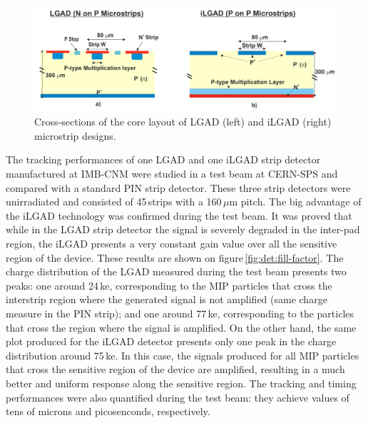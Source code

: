 \begin{figure}[t!]
\centering
\includegraphics[width=0.6\hsize]{Detector/fig/cross-section.png}
\caption{Cross-sections of the core layout of LGAD (left) and iLGAD (right) microstrip designs.}
\label{fig:det:cross-section}
\end{figure}

The tracking performances of one LGAD and one iLGAD strip detector manufactured at IMB-CNM were studied in a test beam at CERN-SPS and compared with a standard PIN strip detector. These three strip detectors were unirradiated and consisted of 45\,strips with a 160\,$\mu$m pitch. 
The big advantage of the iLGAD technology was confirmed during the test beam. It was proved that while in the LGAD strip detector the signal is severely degraded in the inter-pad region, the iLGAD presents a very constant gain value over all the sensitive region of the device. These results are shown on figure\,\ref{fig:det:fill-factor}. The charge distribution of the LGAD measured during the test beam presents two peaks: one around 24\,ke, corresponding to the MIP particles that cross the interstrip region where the generated signal is not amplified (same charge measure in the PIN strip); and one around 77\,ke, corresponding to the particles that cross the region where the signal is amplified. On the other hand, the same plot produced for the iLGAD detector presents only one peak in the charge distribution around 75\,ke. In this case,  the signals produced for all MIP particles that cross the sensitive region of the device are amplified, resulting in a much better and uniform response along the sensitive region. The tracking and timing performances were also quantified during the test beam: they achieve values of tens of microns and picosenconds, respectively.


